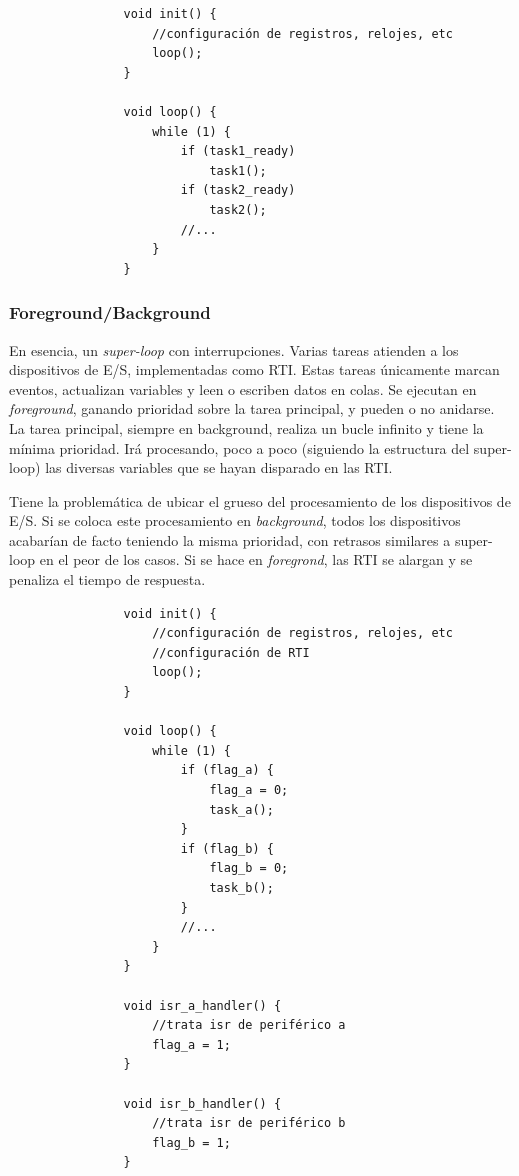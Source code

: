 \documentclass[../main.tex]{subfiles}
\begin{document}
            \begin{lstlisting}
                void init() {
                    //configuración de registros, relojes, etc
                    loop();
                }

                void loop() {
                    while (1) {
                        if (task1_ready)
                            task1();
                        if (task2_ready)
                            task2();
                        //...
                    }
                }
            \end{lstlisting}

    
        \subsubsection{Foreground/Background}

            En esencia, un \emph{super-loop} con interrupciones. Varias tareas atienden a los dispositivos de E/S, implementadas como RTI. Estas tareas únicamente marcan eventos, actualizan variables y leen o escriben datos en colas. Se ejecutan en \emph{foreground}, ganando prioridad sobre la tarea principal, y pueden o no anidarse. La tarea principal, siempre en background, realiza un bucle infinito y tiene la mínima prioridad. Irá procesando, poco a poco (siguiendo la estructura del super-loop) las diversas variables que se hayan disparado en las RTI.

            Tiene la problemática de ubicar el grueso del procesamiento de los dispositivos de E/S. Si se coloca este procesamiento en \emph{background}, todos los dispositivos acabarían de facto teniendo la misma prioridad, con retrasos similares a super-loop en el peor de los casos. Si se hace en \emph{foregrond}, las RTI se alargan y se penaliza el tiempo de respuesta.

            \begin{lstlisting}
                void init() {
                    //configuración de registros, relojes, etc
                    //configuración de RTI
                    loop();
                }

                void loop() {
                    while (1) {
                        if (flag_a) {
                            flag_a = 0;
                            task_a();
                        }
                        if (flag_b) {
                            flag_b = 0;
                            task_b();
                        }
                        //...
                    }
                }

                void isr_a_handler() {
                    //trata isr de periférico a
                    flag_a = 1;
                }

                void isr_b_handler() {
                    //trata isr de periférico b
                    flag_b = 1;
                }
            \end{lstlisting}
\end{document}
